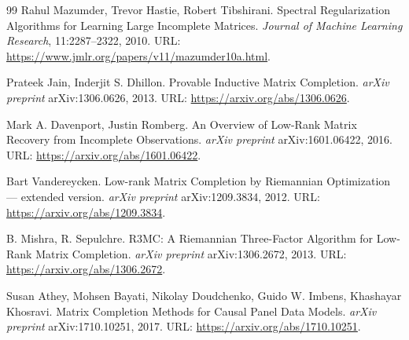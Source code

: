 \documentclass[a4paper,12pt]{article}
\begin{document}
\begin{thebibliography}{99}
Rahul Mazumder, Trevor Hastie, Robert Tibshirani.
\newblock Spectral Regularization Algorithms for Learning Large Incomplete Matrices.
\newblock \textit{Journal of Machine Learning Research}, 11:2287--2322, 2010.
\newblock URL: \url{https://www.jmlr.org/papers/v11/mazumder10a.html}.

Prateek Jain, Inderjit S. Dhillon.
\newblock Provable Inductive Matrix Completion.
\newblock \textit{arXiv preprint} arXiv:1306.0626, 2013.
\newblock URL: \url{https://arxiv.org/abs/1306.0626}.

Mark A. Davenport, Justin Romberg.
\newblock An Overview of Low-Rank Matrix Recovery from Incomplete Observations.
\newblock \textit{arXiv preprint} arXiv:1601.06422, 2016.
\newblock URL: \url{https://arxiv.org/abs/1601.06422}.

Bart Vandereycken.
\newblock Low-rank Matrix Completion by Riemannian Optimization --- extended version.
\newblock \textit{arXiv preprint} arXiv:1209.3834, 2012.
\newblock URL: \url{https://arxiv.org/abs/1209.3834}.

B. Mishra, R. Sepulchre.
\newblock R3MC: A Riemannian Three-Factor Algorithm for Low-Rank Matrix Completion.
\newblock \textit{arXiv preprint} arXiv:1306.2672, 2013.
\newblock URL: \url{https://arxiv.org/abs/1306.2672}.

Susan Athey, Mohsen Bayati, Nikolay Doudchenko, Guido W. Imbens, Khashayar Khosravi.
\newblock Matrix Completion Methods for Causal Panel Data Models.
\newblock \textit{arXiv preprint} arXiv:1710.10251, 2017.
\newblock URL: \url{https://arxiv.org/abs/1710.10251}.

\end{thebibliography}
\end{document}
